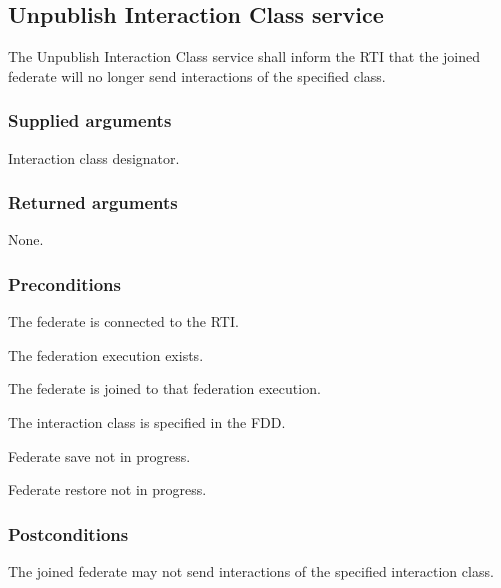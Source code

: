 \clearpage

\begin{compactstdpage}
    \subsection{Unpublish Interaction Class service}

    The Unpublish Interaction Class service shall inform the RTI that the joined federate will no longer send interactions of the specified class.

    \subsubsection{Supplied arguments}
    \begin{stdalphalist}
        \item Interaction class designator.
    \end{stdalphalist}

    \subsubsection{Returned arguments}
    \begin{stdalphalist}
        \item None.
    \end{stdalphalist}

    \subsubsection{Preconditions}
    \begin{stdalphalist}
        \item The federate is connected to the RTI.
        \item The federation execution exists.
        \item The federate is joined to that federation execution.
        \item The interaction class is specified in the FDD.
        \item Federate save not in progress.
        \item Federate restore not in progress.
    \end{stdalphalist}

    \subsubsection{Postconditions}
    \begin{stdalphalist}
        \item The joined federate may not send interactions of the specified interaction class.
    \end{stdalphalist}


\end{compactstdpage}
